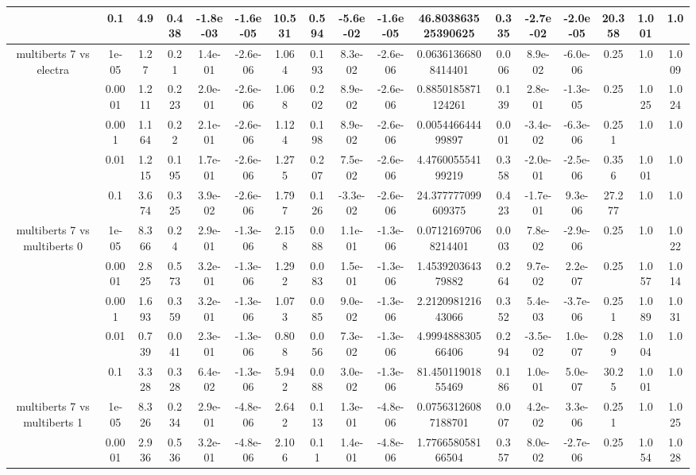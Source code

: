 \begin{tabular}{|c|c|c|c|c|c|c|c|c|c|c|c|c|c|c|c|c|}
 & 0.1 & 4.9 & 0.438 & -1.8e-03 & -1.6e-05 & 10.531 & 0.594 & -5.6e-02 & -1.6e-05 & 46.803863525390625 & 0.335 & -2.7e-02 & -2.0e-05 & 20.358 & 1.001 & 1.0 \\
\hline
\multirow{5}{*}{multiberts 7 vs electra } & 1e-05 & 1.27 & 0.21 & 1.4e-01 & -2.6e-06 & 1.064 & 0.193 & 8.3e-02 & -2.6e-06 & 0.06361366808414401 & 0.006 & 8.9e-02 & -6.0e-06 & 0.25 & 1.0 & 1.009 \\
 & 0.0001 & 1.211 & 0.223 & 2.0e-01 & -2.6e-06 & 1.068 & 0.202 & 8.9e-02 & -2.6e-06 & 0.8850185871124261 & 0.139 & 2.8e-01 & -1.3e-05 & 0.25 & 1.025 & 1.024 \\
 & 0.001 & 1.164 & 0.22 & 2.1e-01 & -2.6e-06 & 1.124 & 0.198 & 8.9e-02 & -2.6e-06 & 0.005446644499897 & 0.001 & -3.4e-02 & -6.3e-06 & 0.251 & 1.0 & 1.0 \\
 & 0.01 & 1.215 & 0.195 & 1.7e-01 & -2.6e-06 & 1.275 & 0.207 & 7.5e-02 & -2.6e-06 & 4.476005554199219 & 0.358 & -2.0e-01 & -2.5e-06 & 0.356 & 1.001 & 1.0 \\
 & 0.1 & 3.674 & 0.325 & 3.9e-02 & -2.6e-06 & 1.797 & 0.126 & -3.3e-02 & -2.6e-06 & 24.377777099609375 & 0.423 & -1.7e-01 & 9.3e-06 & 27.277 & 1.0 & 1.0 \\
\hline
\multirow{5}{*}{multiberts 7 vs multiberts 0} & 1e-05 & 8.366 & 0.24 & 2.9e-01 & -1.3e-06 & 2.158 & 0.088 & 1.1e-01 & -1.3e-06 & 0.07121697068214401 & 0.003 & 7.8e-02 & -2.9e-06 & 0.25 & 1.0 & 1.022 \\
 & 0.0001 & 2.825 & 0.573 & 3.2e-01 & -1.3e-06 & 1.292 & 0.083 & 1.5e-01 & -1.3e-06 & 1.453920364379882 & 0.264 & 9.7e-02 & 2.2e-07 & 0.25 & 1.057 & 1.014 \\
 & 0.001 & 1.693 & 0.359 & 3.2e-01 & -1.3e-06 & 1.073 & 0.085 & 9.0e-02 & -1.3e-06 & 2.212098121643066 & 0.352 & 5.4e-03 & -3.7e-06 & 0.251 & 1.089 & 1.031 \\
 & 0.01 & 0.739 & 0.041 & 2.3e-01 & -1.3e-06 & 0.808 & 0.056 & 7.3e-02 & -1.3e-06 & 4.999488830566406 & 0.294 & -3.5e-02 & 1.0e-07 & 0.289 & 1.004 & 1.0 \\
 & 0.1 & 3.328 & 0.328 & 6.4e-02 & -1.3e-06 & 5.942 & 0.088 & 3.0e-02 & -1.3e-06 & 81.45011901855469 & 0.186 & 1.0e-01 & 5.0e-07 & 30.25 & 1.001 & 1.0 \\
\hline
\multirow{5}{*}{multiberts 7 vs multiberts 1} & 1e-05 & 8.326 & 0.234 & 2.9e-01 & -4.8e-06 & 2.642 & 0.113 & 1.3e-01 & -4.8e-06 & 0.07563126087188701 & 0.007 & 4.2e-02 & 3.3e-06 & 0.251 & 1.0 & 1.025 \\
 & 0.0001 & 2.936 & 0.536 & 3.2e-01 & -4.8e-06 & 2.106 & 0.11 & 1.4e-01 & -4.8e-06 & 1.776658058166504 & 0.357 & 8.0e-02 & -2.7e-06 & 0.25 & 1.054 & 1.028 \\

\end{tabular}
